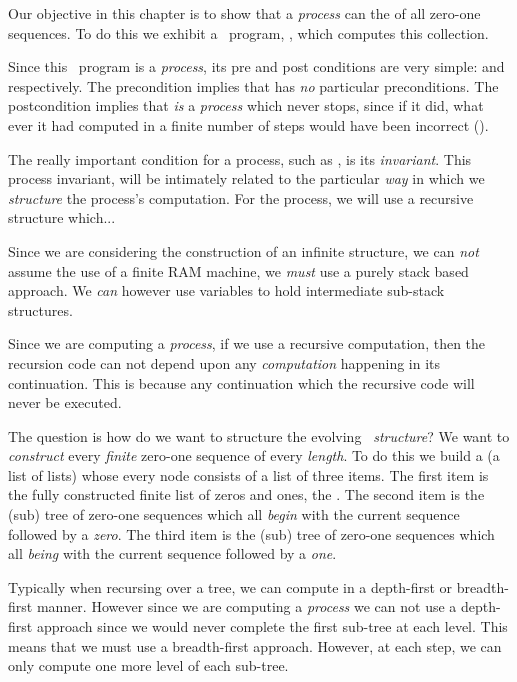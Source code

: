 \stopMPcode\egroup

Our objective in this chapter is to show that a \emph{process} can 
 the  of all zero-one sequences. To do 
this we exhibit a \joylol\ program, , which computes this 
collection. 

Since this \joylol\ program is a \emph{process}, its pre and post 
conditions are very simple:  and  respectively. The 
 precondition implies that  has \emph{no} 
particular preconditions. The  postcondition implies that 
 \emph{is} a \emph{process} which never stops, since if it 
did, what ever it had computed in a finite number of steps would have been 
incorrect (). 

The really important condition for a process, such as , is 
its \emph{invariant}. This process invariant, will be intimately related 
to the particular \emph{way} in which we \emph{structure} the process's 
computation. For the  process, we will use a recursive 
structure which... 

Since we are considering the construction of an infinite structure, we can 
\emph{not} assume the use of a finite RAM machine, we \emph{must} use a 
purely stack based approach. We \emph{can} however use  
variables to hold intermediate sub-stack structures. 

Since we are computing a \emph{process}, if we use a recursive 
computation, then the recursion code can not depend upon any 
\emph{computation} happening in its continuation. This is because any 
continuation which the recursive code  will never be executed. 

The question is how do we want to structure the evolving \emph{\joylol\ 
structure}? We want to \emph{construct} every \emph{finite} zero-one 
sequence of every \emph{length}. To do this we build a \quote{tree} (a 
list of lists) whose every node consists of a list of three items. The 
first item is the fully constructed finite list of zeros and ones, the 
\quote{current sequence}. The second item is the (sub) tree of zero-one 
sequences which all \emph{begin} with the current sequence followed by a 
\emph{zero}. The third item is the (sub) tree of zero-one sequences which 
all \emph{being} with the current sequence followed by a \emph{one}. 

Typically when recursing over a tree, we can compute in a depth-first or 
breadth-first manner. However since we are computing a \emph{process} we 
can not use a depth-first approach since we would never complete the first 
sub-tree at each level. This means that we must use a breadth-first 
approach. However, at each step, we can only compute one more level of 
each sub-tree. 


